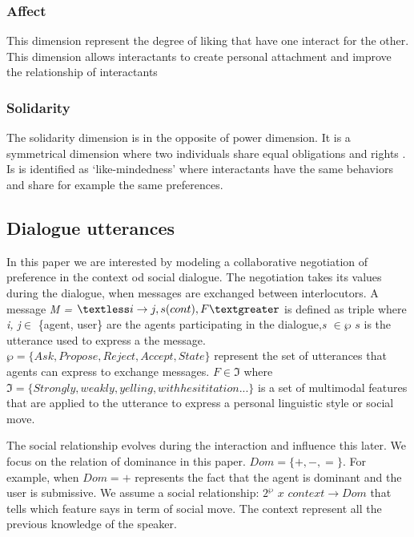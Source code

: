 \documentclass{llncs}
\begin{document}
\subsubsection{Affect}
This dimension represent the degree of liking that have one interact for the other. This dimension allows interactants to create personal attachment and improve the relationship of interactants \cite{nicholson2001role}
\subsubsection{Solidarity}
The solidarity dimension is in the opposite of power dimension. It is a symmetrical dimension where two individuals share equal obligations and rights \cite{svennevig2000getting}. Is is identified as ‘like-mindedness’ \cite{bickmore2005establishing} where interactants have the same behaviors and share for example the same preferences.
\subsection{Dialogue utterances}
In this paper we are interested by modeling a collaborative negotiation of preference in the context od social dialogue. The negotiation takes its values during the dialogue, when messages are exchanged between interlocutors. A message \emph{M = $\textless i \rightarrow j, s(cont), F  \textgreater$} is defined as triple where \emph{i, j}$\in$ \{agent, user\} are the agents participating in the dialogue,\emph{s $\in \wp$}  $s$ is the utterance used to express a the message. $\wp = \{ Ask, Propose, Reject, Accept, State\}$  represent the set of utterances that agents can express to exchange messages. 
 $F \in \Im $  where $\Im = \{ Strongly, weakly, yelling, with hesititation ...\}$ is a set of multimodal features that are applied to the utterance to express a personal linguistic style or social move.
 
 \par The social relationship evolves during the interaction and influence this later. We focus on the relation of dominance in this paper. $Dom = \{+, -, =\}$. For example, when $Dom = +$ represents the fact that the agent is dominant and the user is submissive. 
 We assume a social relationship: $2^\wp$ $x$  $context \rightarrow Dom $ that tells which feature says in term of social move. The context represent all the previous knowledge of the speaker. 
 
\end{document}
